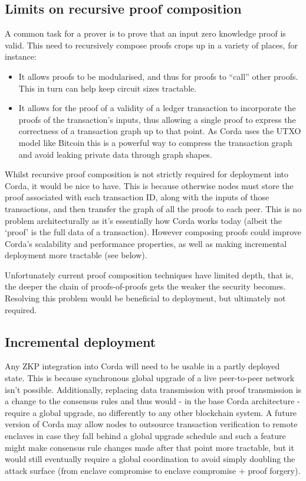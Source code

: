 \documentclass{article}
\begin{document}
\subsection{Limits on recursive proof composition}

A common task for a prover is to prove that an input zero knowledge proof is valid. This need to recursively
compose proofs crops up in a variety of places, for instance:

\begin{itemize}
    \item It allows proofs to be modularised, and thus for proofs to ``call'' other proofs. This in turn can help
    keep circuit sizes tractable.
    \item It allows for the proof of a validity of a ledger transaction to incorporate the proofs of the transaction's
    inputs, thus allowing a single proof to express the correctness of a transaction graph up to that point. As Corda
    uses the UTXO model like Bitcoin this is a powerful way to compress the transaction graph and avoid leaking private
    data through graph shapes.
\end{itemize}

Whilst recursive proof composition is not strictly required for deployment into Corda, it would be nice to have.
This is because otherwise nodes must store the proof associated with each transaction ID, along with the inputs
of those transactions, and then transfer the graph of all the proofs to each peer. This is no problem
architecturally as it's essentially how Corda works today (albeit the `proof' is the full data of a transaction).
However composing proofs could improve Corda's scalability and performance properties, as well as making
incremental deployment more tractable (see below).

Unfortunately current proof composition techniques have limited depth, that is, the deeper the chain of
proofs-of-proofs gets the weaker the security becomes. Resolving this problem would be beneficial to
deployment, but ultimately not required.

\subsection{Incremental deployment}\label{subsec:incremental-deployment}

Any ZKP integration into Corda will need to be usable in a partly deployed state. This is because synchronous
global upgrade of a live peer-to-peer network isn't possible. Additionally, replacing data transmission
with proof transmission is a change to the consensus rules and thus would - in the base Corda architecture -
require a global upgrade, no differently to any other blockchain system. A future version of Corda may allow
nodes to outsource transaction verification to remote enclaves in case they fall behind a global upgrade
schedule and such a feature might make consensus rule changes made after that point more tractable, but it
would still eventually require a global coordination to avoid simply doubling the attack surface (from enclave
compromise to enclave compromise + proof forgery).
\end{document}
